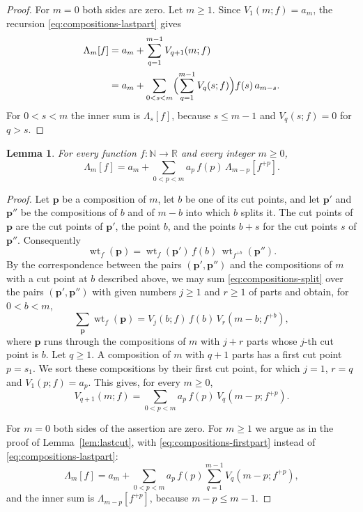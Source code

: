 \documentclass{amsart}
\newtheorem{lemma}[theorem]{Lemma}
\theoremstyle{definition}
\theoremstyle{remark}
\numberwithin{equation}{section}
\begin{document}
\begin{proof}
For $m=0$ both sides are zero. Let $m\ge1$. Since $V_1(m;f)=a_m$, the
recursion \eqref{eq:compositions-lastpart} gives
\begin{align*}
\Lambda_m[f]&=a_m+\sum_{q=1}^{m-1}V_{q+1}(m;f)\\
&=a_m+\sum_{0<s<m}\Bigl(\sum_{q=1}^{m-1}V_q(s;f)\Bigr)f(s)\,a_{m-s}.
\end{align*}
For $0<s<m$ the inner sum is $\Lambda_s[f]$, because $s\le m-1$ and
$V_q(s;f)=0$ for $q>s$.
\end{proof}

\begin{lemma}\label{lem:firstpart}
For every function $f\colon\mathbb N\to\mathbb R$ and every integer $m\ge0$,
\[
\Lambda_m[f]=a_m+\sum_{0<p<m}a_p\,f(p)\,\Lambda_{m-p}[f^{+p}].
\]
\end{lemma}

\begin{proof}
Let $\mathbf p$ be a composition of $m$, let $b$ be one of its cut points, and
let $\mathbf p'$ and $\mathbf p''$ be the compositions of $b$ and of $m-b$ into
which $b$ splits it. The cut points of $\mathbf p$ are the cut points of
$\mathbf p'$, the point $b$, and the points $b+s$ for the cut points $s$ of
$\mathbf p''$. Consequently
\begin{equation}\label{eq:compositions-split}
\operatorname{wt}_f(\mathbf p)=\operatorname{wt}_f(\mathbf p')\,f(b)\,
\operatorname{wt}_{f^{+b}}(\mathbf p'').
\end{equation}
By the correspondence between the pairs $(\mathbf p',\mathbf p'')$ and the
compositions of $m$ with a cut point at $b$ described above, we may sum
\eqref{eq:compositions-split} over the pairs $(\mathbf p',\mathbf p'')$ with given numbers
$j\ge1$ and $r\ge1$ of parts and obtain, for $0<b<m$,
\begin{equation}\label{eq:compositions-parts}
\sum_{\mathbf p}\operatorname{wt}_f(\mathbf p)=V_j(b;f)\,f(b)\,V_r(m-b;f^{+b}),
\end{equation}
where $\mathbf p$ runs through the compositions of $m$ with $j+r$ parts whose $j$-th
cut point is $b$. Let $q\ge1$. A composition of $m$ with $q+1$ parts has a
first cut point $p=s_1$. We sort these compositions by their first cut
point, for which $j=1$, $r=q$ and $V_1(p;f)=a_p$. This gives, for every
$m\ge0$,
\begin{equation}\label{eq:compositions-firstpart}
V_{q+1}(m;f)=\sum_{0<p<m}a_p\,f(p)\,V_q(m-p;f^{+p}).
\end{equation}

For $m=0$ both sides of the assertion are zero. For $m\ge1$ we argue as in
the proof of
Lemma~\ref{lem:lastcut}, with \eqref{eq:compositions-firstpart} instead of
\eqref{eq:compositions-lastpart}:
\[
\Lambda_m[f]=a_m+\sum_{0<p<m}a_p\,f(p)\sum_{q=1}^{m-1}V_q(m-p;f^{+p}),
\]
and the inner sum is $\Lambda_{m-p}[f^{+p}]$, because $m-p\le m-1$.
\end{proof}
\end{document}
